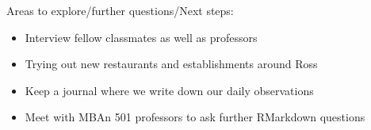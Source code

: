 \documentclass[
]{book}
\providecommand{\tightlist}{%
  \setlength{\itemsep}{0pt}\setlength{\parskip}{0pt}}
\begin{document}
Areas to explore/further questions/Next steps:

\begin{itemize}
\tightlist
\item
  Interview fellow classmates as well as professors
\item
  Trying out new restaurants and establishments around Ross
\item
  Keep a journal where we write down our daily observations
\item
  Meet with MBAn 501 professors to ask further RMarkdown questions
\end{itemize}

  
\end{document}
